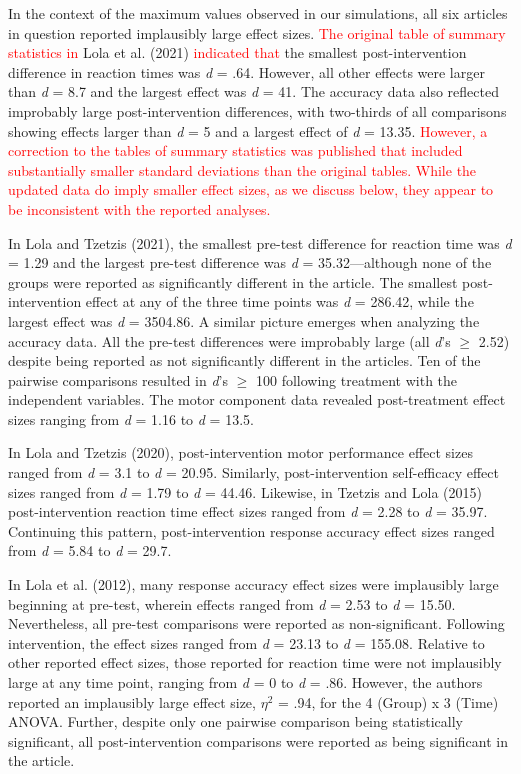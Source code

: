 \documentclass[
  english,
  man, donotrepeattitle,floatsintext]{apa7}
\begin{document}
In the context of the maximum values observed in our simulations, all six articles in question reported implausibly large effect sizes. \textcolor{red}{The original table of summary statistics in} Lola et al. (2021) \textcolor{red}{indicated that} the smallest post-intervention difference in reaction times was \emph{d} = .64. However, all other effects were larger than \emph{d} = 8.7 and the largest effect was \emph{d} = 41. The accuracy data also reflected improbably large post-intervention differences, with two-thirds of all comparisons showing effects larger than \emph{d} = 5 and a largest effect of \emph{d} = 13.35. \textcolor{red}{However, a correction to the tables of summary statistics was published that included substantially smaller standard deviations than the original tables. While the updated data do imply smaller effect sizes, as we discuss below, they appear to be inconsistent with the reported analyses.}

In Lola and Tzetzis (2021), the smallest pre-test difference for reaction time was \emph{d} = 1.29 and the largest pre-test difference was \emph{d} = 35.32---although none of the groups were reported as significantly different in the article. The smallest post-intervention effect at any of the three time points was \emph{d} = 286.42, while the largest effect was \emph{d} = 3504.86. A similar picture emerges when analyzing the accuracy data. All the pre-test differences were improbably large (all \emph{d}'s \(\geq\) 2.52) despite being reported as not significantly different in the articles. Ten of the pairwise comparisons resulted in \emph{d}'s \(\geq\) 100 following treatment with the independent variables. The motor component data revealed post-treatment effect sizes ranging from \emph{d} = 1.16 to \emph{d} = 13.5.

In Lola and Tzetzis (2020), post-intervention motor performance effect sizes ranged from \emph{d} = 3.1 to \emph{d} = 20.95. Similarly, post-intervention self-efficacy effect sizes ranged from \emph{d} = 1.79 to \emph{d} = 44.46. Likewise, in Tzetzis and Lola (2015) post-intervention reaction time effect sizes ranged from \emph{d} = 2.28 to \emph{d} = 35.97. Continuing this pattern, post-intervention response accuracy effect sizes ranged from \emph{d} = 5.84 to \emph{d} = 29.7.

In Lola et al. (2012), many response accuracy effect sizes were implausibly large beginning at pre-test, wherein effects ranged from \emph{d} = 2.53 to \emph{d} = 15.50. Nevertheless, all pre-test comparisons were reported as non-significant. Following intervention, the effect sizes ranged from \emph{d} = 23.13 to \emph{d} = 155.08. Relative to other reported effect sizes, those reported for reaction time were not implausibly large at any time point, ranging from \emph{d} = 0 to \emph{d} = .86. However, the authors reported an implausibly large effect size, \(\eta^{2}\) = .94, for the 4 (Group) x 3 (Time) ANOVA. Further, despite only one pairwise comparison being statistically significant, all post-intervention comparisons were reported as being significant in the article.
\end{document}
